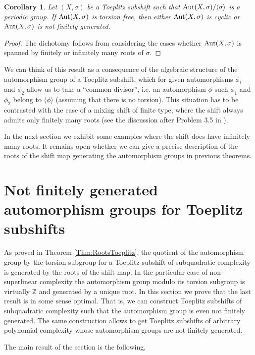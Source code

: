 \documentclass{daj}
\theoremstyle{plain}
\newtheorem{corollary}[theorem]{Corollary}
\theoremstyle{definition}
\begin{document}
\begin{corollary} \label{Cor:DichotomyRoots}
	Let $(X,\sigma)$ be a Toeplitz subshift such that ${\rm Aut}(X,\sigma)/\langle \sigma \rangle$ is a periodic group. If ${\rm Aut}(X,\sigma)$ is torsion free, then either ${\rm Aut}(X,\sigma)$ is cyclic or ${\rm Aut}(X,\sigma)$ is not finitely generated. 
\end{corollary}
\begin{proof}
	The dichotomy follows from considering the cases whether ${\rm Aut}(X,\sigma)$ is spanned by finitely or infinitely many roots of $\sigma$.
\end{proof}
We can think of this result as a consequence of the algebraic structure of the automorphism group of a Toeplitz subshift, which for given automorphisms $\phi_1$ and $\phi_2$ allow us to take a ``common divisor'', i.e. an automorphism $\phi$ such $\phi_1$ and $\phi_2$ belong to $\langle \phi \rangle$ (assuming that there is no torsion).  This situation has to be contrasted with the case of a mixing shift of finite type, where the shift always admits only finitely many roots (see the discussion after Problem 3.5 in \cite{BoyleLindRudolph}).

 In the next section we exhibit some examples where the shift does have infinitely many roots. It remains open whether we can give a precise description of the roots of the shift map generating the automorphism groups in previous theorems.

\section{Not finitely generated automorphism groups for Toeplitz subshifts}
\label{sec:pqtoeplitz}

As proved in Theorem \ref{Thm:RootsToeplitz}, 
the quotient of the automorphism group by the torsion subgroup for a Toeplitz subshift of subquadratic complexity is generated by the roots of the shift map. In the particular case of non-superlinear complexity the automorphism group modulo its torsion subgroup is virtually $\mathbb{Z}$ and generated by a unique root. In this section we prove that the last result is in some sense optimal. That is, we can construct Toeplitz subshifts of subquadratic complexity such that the automorphism group is even not finitely generated. The same construction allows to get Toeplitz subshifts of arbitrary polynomial complexity whose automorphism groups are not finitely generated. 

The main result of the section is the following, 
\end{document}
